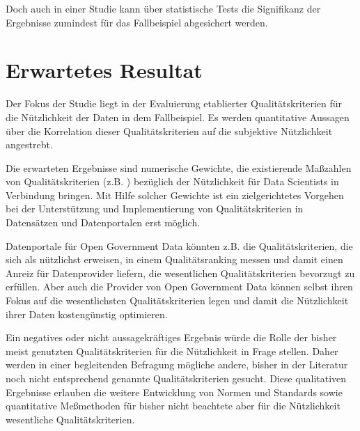 \documentclass[a4paper,10pt,german,public]{INSOexpose}
\begin{document}
Doch auch in einer Studie kann über statistische Tests die Signifikanz
der Ergebnisse zumindest für das Fallbeispiel abgesichert werden.

\section{Erwartetes Resultat}


Der Fokus der Studie liegt in der Evaluierung etablierter
Qualitätskriterien für die Nützlichkeit der Daten in dem Fallbeispiel.
Es werden quantitative Aussagen über die Korrelation dieser
Qualitätskriterien auf die subjektive Nützlichkeit angestrebt.

Die erwarteten Ergebnisse sind numerische Gewichte, die existierende
Maßzahlen von Qualitätskriterien (z.B. \cite{VETRO2016325}) bezüglich
der Nützlichkeit für Data Scientists in Verbindung bringen.
Mit Hilfe solcher Gewichte ist ein zielgerichtetes Vorgehen bei der
Unterstützung und Implementierung von Qualitätskriterien in Datensätzen
und Datenportalen erst möglich.

Datenportale für Open Government Data könnten z.B. die Qualitätskriterien,
die sich als nützlichst erweisen, in einem Qualitätsranking messen und
damit einen Anreiz für Datenprovider liefern, die wesentlichen
Qualitätskriterien bevorzugt zu erfüllen.
Aber auch die Provider von Open Government Data können selbst ihren
Fokus auf die wesentlichsten Qualitätskriterien legen und damit
die Nützlichkeit ihrer Daten kostengünstig optimieren.

Ein negatives oder nicht aussagekräftiges Ergebnis würde die Rolle
der bisher meist genutzten Qualitätskriterien für die Nützlichkeit
in Frage stellen.
Daher werden in einer begleitenden Befragung mögliche andere,
bisher in der Literatur noch nicht entsprechend genannte
Qualitätskriterien gesucht.
Diese qualitativen Ergebnisse erlauben die weitere Entwicklung von
Normen und Standards sowie quantitative Meßmethoden für bisher nicht
beachtete aber für die Nützlichkeit wesentliche Qualitätskriterien.
\end{document}
